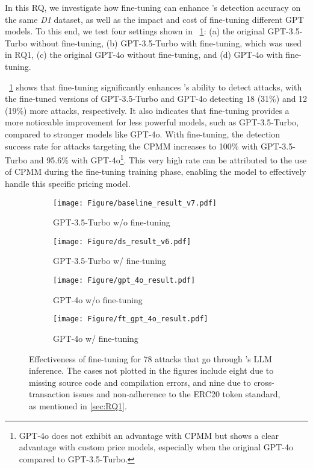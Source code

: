 In this RQ, we investigate how fine-tuning can enhance \name's detection accuracy on the same \textit{D1} dataset, as well as the impact and cost of fine-tuning different GPT models.
To this end, we test four settings shown in \myfig~\ref{fig:RQ_2}: (a) the original GPT-3.5-Turbo without fine-tuning, (b) GPT-3.5-Turbo with fine-tuning, which was used in RQ1, (c) the original GPT-4o without fine-tuning, and (d) GPT-4o with fine-tuning.

\myfig~\ref{fig:RQ_2} shows that fine-tuning significantly enhances \name's ability to detect attacks, with the fine-tuned versions of GPT-3.5-Turbo and GPT-4o detecting 18 (31\%) and 12 (19\%) more attacks, respectively.
It also indicates that fine-tuning provides a more noticeable improvement for less powerful models, such as GPT-3.5-Turbo, compared to stronger models like GPT-4o.
With fine-tuning, the detection success rate for attacks targeting the CPMM increases to 100\% with GPT-3.5-Turbo and 95.6\% with GPT-4o\footnote{GPT-4o does not exhibit an advantage with CPMM but shows a clear advantage with custom price models, especially when the original GPT-4o compared to GPT-3.5-Turbo.}.
This very high rate can be attributed to the use of CPMM during the fine-tuning training phase, enabling the model to effectively handle this specific pricing model.

\begin{figure}[t]
\centering
  \begin{subfigure}[t]{.49\columnwidth}
        \texttt{[image: Figure/baseline\_result\_v7.pdf]}
        \caption{GPT-3.5-Turbo w/o fine-tuning}
    \end{subfigure}
    \hfill
    \begin{subfigure}[t]{.49\columnwidth}
        \texttt{[image: Figure/ds\_result\_v6.pdf]}
        \caption{GPT-3.5-Turbo w/ fine-tuning}
    \end{subfigure}
    \begin{subfigure}[t]{.49\columnwidth}
        \texttt{[image: Figure/gpt\_4o\_result.pdf]}
        \caption{GPT-4o w/o fine-tuning}
    \end{subfigure}
    \hfill
    \begin{subfigure}[t]{.49\columnwidth}
        \texttt{[image: Figure/ft\_gpt\_4o\_result.pdf]}
        \caption{GPT-4o w/ fine-tuning}
    \end{subfigure}
    \vspace{-1ex}
\caption{Effectiveness of fine-tuning for 78 attacks that go through \name's LLM inference. The cases not plotted in the figures include eight due to missing source code and compilation errors, and nine due to cross-transaction issues and non-adherence to the ERC20 token standard, as mentioned in \mysec\ref{sec:RQ1}.}
    \vspace{1ex}
    \label{fig:RQ_2}
\end{figure}

